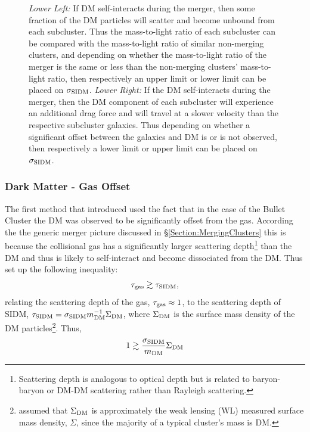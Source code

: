 \begin{figure}
{\emph{Lower Left:} If DM self-interacts during the merger, then some fraction of the DM particles will scatter and become unbound from each subcluster.
Thus the mass-to-light ratio of each subcluster can be compared with the mass-to-light ratio of similar non-merging clusters, and depending on whether the mass-to-light ratio of the merger is the same or less than the non-merging clusters' mass-to-light ratio, then respectively an upper limit or lower limit can be placed on $\sigma_{\rm SIDM}$.
\emph{Lower Right:} If the DM self-interacts during the merger, then the DM component of each subcluster will experience an additional drag force and will travel at a slower velocity than the respective subcluster galaxies.
Thus depending on whether a significant offset between the galaxies and DM is or is not observed, then respectively a lower limit or upper limit can be placed on $\sigma_{\rm SIDM}$.
\label{fig:4ConstraintMethods}}
\end{figure}

\subsubsection{Dark Matter - Gas Offset}
The first method that \citet{Markevitch:2004dl} introduced used the fact that in the case of the Bullet Cluster the DM was observed to be significantly offset from the gas.
According the the generic merger picture discussed in \S \ref{Section:MergingClusters} this is because the collisional gas has a significantly larger scattering depth\footnote{Scattering depth is analogous to optical depth but is related to baryon-baryon or DM-DM scattering rather than Rayleigh scattering.} than the DM and thus is likely to self-interact and become dissociated from the DM.
Thus \citet{Markevitch:2004dl} set up the following inequality: 
\begin{displaymath}
\tau_{\rm gas} \gtrsim \tau_{\rm SIDM},
\end{displaymath}
relating the scattering depth of the gas, $\tau_{\rm gas}\approx 1$, to the scattering depth of SIDM, $\tau_{\rm SIDM}=\sigma_{\rm SIDM}m^{-1}_{\rm DM} \Sigma_{\rm DM}$, where $\Sigma_{\rm DM}$ is the surface mass density of the DM particles\footnote{\citet{Markevitch:2004dl} assumed that $\Sigma_{\rm DM}$ is approximately the weak lensing (WL) measured surface mass density, $\Sigma$, since the majority of a typical cluster's mass is DM.}.
Thus,
\begin{displaymath}
1 \gtrsim \frac{\sigma_{\rm SIDM}}{m_{\rm DM}} \Sigma_{\rm DM}
\end{displaymath}


